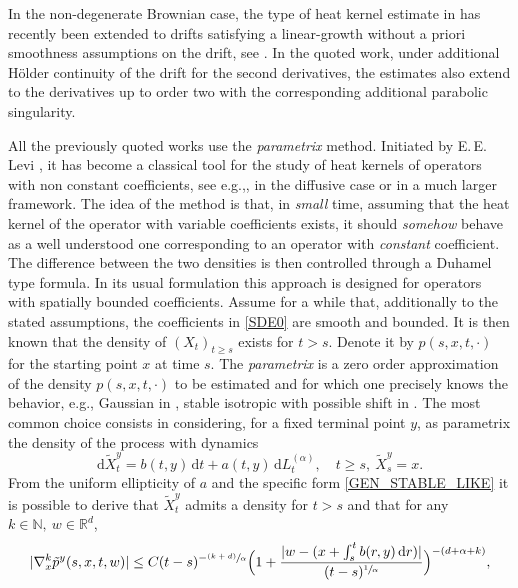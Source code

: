 \documentclass[11pt]{article}
\newcommand{\eg}{e.g.,\xspace}
\numberwithin{equation}{section}\providecommand{\asymp}{\mathrel{\sim}}
\newcommand{\psfrac}[2]{\sfrac{(#1)}{#2}}
\newcommand{\rd}{\mathrm{d}}
\theoremstyle{plain}
\theoremstyle{definition}
\newcommand\mN{\mathbb{N}}
\newcommand\mR{\mathbb{R}}
\newcommand\1{{\mathbf{1}}}
\newcommand{\dif}{\,\mathrm{d}}
\begin{document}
In the non-degenerate Brownian case, the type of heat kernel estimate in \cite{dela:meno:10} has recently been extended to drifts satisfying a linear-growth without a priori smoothness assumptions on the drift, see \cite{meno:pesc:zhan:20}. In the quoted work, under additional Hölder continuity of the drift for the second derivatives, the estimates also extend to the derivatives up to order two with the corresponding additional parabolic singularity.

{All the previously quoted works use the \textit{parametrix} method. Initiated by E.\,E.\,Levi \cite{levi:07}, it has become a classical tool for the study of heat kernels of operators with non constant coefficients, see \eg \cite{Friedman}, \cite{mcke:sing:67} in the diffusive case or {\cite{koch:89} in a much larger framework}. The idea of the method is that, in \textit{small} time, assuming that the heat kernel of the operator with variable coefficients exists, it should \textit{somehow} behave as a well understood one corresponding to an operator with \textit{constant} coefficient. The difference between the two densities is then controlled through a Duhamel type formula.
In its usual formulation this approach is designed for operators with spatially bounded coefficients. Assume for a while that, additionally to the stated assumptions, the coefficients in \eqref{SDE0} are smooth and bounded. It is then known that the density of $(X_t)_{t\ge s}$ exists for $t>s$. Denote it by $p(s,x,t,\cdot)$ for the starting point $x$ at time $s$. The \textit{parametrix} is a zero order approximation of the density $p(s,x,t,\cdot) $ to be estimated and for which one precisely knows the behavior, \eg Gaussian in \cite{Friedman}, stable isotropic with possible shift in \cite{kolo:00}. The most common choice consists in considering, for a fixed terminal point $y$, as parametrix the density of the process with dynamics
\begin{equation}\label{PROXY_1}
\rd \tilde X_t^y=b(t,y)\dif t+a(t,y)\dif L^{(\alpha)}_t,\quad t\ge s,\ \tilde X_s^y=x.
\end{equation}
From the uniform ellipticity of $a$ and the specific form \eqref{GEN_STABLE_LIKE} it is possible to derive that
$ \tilde X_t^y$ admits a density for $t>s$ and that for any $k\in \mN,\ w\in \mR^d$,
\begin{align}\label{GRAD_BD_INTRO}
|\nabla_x^k \tilde p^y(s,x,t,w)|\le C (t-s)^{-\psfrac{k+d}\alpha}\Bigl(1+\frac{|w-(x+\int_s^t b(r,y)\dif r )|}{(t-s)^{\sfrac 1\alpha}}\Bigr)^{-(d+\alpha+k)},
\end{align}
}
\end{document}
